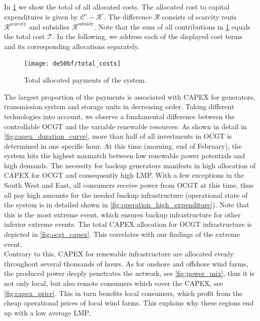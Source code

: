 \documentclass[11pt,twocolumn]{article}
\newcommand{\totalcost}{\mathcal{T}}
\newcommand{\cost}[1][\circ]{\mathcal{C}^{#1}}
\newcommand{\remainingcost}{\mathcal{R}}
\newcommand{\scarcitycost}{\remainingcost^\text{scarcity}}
\newcommand{\subsidycost}{\remainingcost^\text{subsidy}}
\begin{document}
In \cref{fig:total_cost} we show the total of all allocated costs. The allocated cost to capital expenditures is given by $\cost - \remainingcost^\circ$. The difference $\remainingcost$ consists of scarcity rents $\scarcitycost$ and subsidies $\subsidycost$. Note that the sum of all contributions in \cref{fig:total_cost} equals the total cost $\totalcost$.  
In the following, we address each of the displayed cost terms and its corresponding allocations separately.   

\begin{figure}
    \centering
    \texttt{[image: de50bf/total\_costs]}
    \caption{Total allocated payments of the system. }
    \label{fig:total_cost}
\end{figure}


The largest proportion of the payments is associated with CAPEX for generators, transmission system and storage units in decreasing order. 
Taking different technologies into account, we observe a fundamental difference between the controllable OCGT  and the variable renewable resources: As shown in detail in \cref{fig:capex_duration_curve}, more than half of all investments in OCGT is determined in one specific hour. At this time (morning, end of February), the system hits the highest mismatch between low renewable power potentials and high demands. The necessity for backup generators manifests in high allocation of CAPEX for OCGT and consequently high LMP. With a few exceptions in the South West and East, all consumers receive power from OCGT at this time, thus all pay high amounts for the needed backup infrastructure (operational state of the system is in detailed shown in \cref{fig:operation_high_expenditure}). Note that this is the most extreme event, which ensures backup infrastructure for other inferior extreme events. The total CAPEX allocation for OCGT infrastructure is depicted in \cref{fig:ocgt_capex}. This  correlates with our findings of the extreme event. \\
Contrary to this, CAPEX for renewable infrastructure are allocated evenly throughout several thousands of hours. As for onshore and offshore wind farms, the produced power deeply penetrates the network, see \cref{fig:power_mix}, thus it is not only local, but also remote consumers which cover the CAPEX, see \cref{fig:capex_price}. This in turn benefits local consumers, which profit from the cheap operational prices of local wind farms. This explains why these regions end up with a low average LMP.\\
\end{document}
